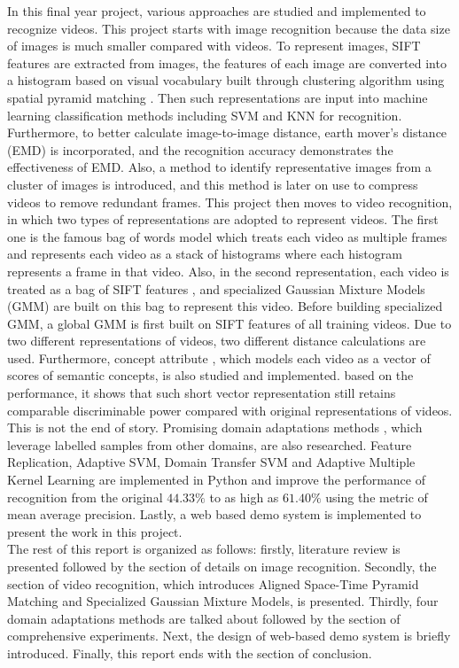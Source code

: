 \noindent In this final year project, various approaches are studied and implemented to recognize videos. This project starts with image recognition because the data size of images is much smaller compared with videos. To represent images, SIFT features \cite{lowe2004distinctive} are extracted from images, the features of each image are converted into a histogram based on visual vocabulary built through clustering algorithm using spatial pyramid matching \cite{lazebnik2006beyond}. Then such representations are input into machine learning classification methods including SVM and KNN for recognition. Furthermore, to better calculate image-to-image distance, earth mover's distance (EMD) \cite{rubner2000earth} is incorporated, and the recognition accuracy demonstrates the effectiveness of EMD. Also, a method to identify representative images from a cluster of images is introduced, and this method is later on use to compress videos to remove redundant frames. This project then moves to video recognition, in which two types of representations are adopted to represent videos. The first one is the famous bag of words model which treats each video as multiple frames and represents each video as a stack of histograms \cite{duan2012visual} where each histogram represents a frame in that video. Also, in the second representation, each video is treated as a bag of SIFT features \cite{zhou2008sift}, and specialized Gaussian Mixture Models (GMM) are built on this bag to represent this video. Before building specialized GMM, a global GMM is first built on SIFT features of all training videos. Due to two different representations of videos, two different distance calculations are used. Furthermore, concept attribute \cite{liu2013video}, which models each video as a vector of scores of semantic concepts, is also studied and implemented. based on the performance, it shows that such short vector representation still retains comparable discriminable power compared with original representations of videos. This is not the end of story. Promising domain adaptations methods \cite{duan2012visual, duan2009domain, yang2007cross, daume2007frustratingly}, which leverage labelled samples from other domains, are also researched. Feature Replication, Adaptive SVM, Domain Transfer SVM and Adaptive Multiple Kernel Learning are implemented in Python and improve the performance of recognition from the original $44.33\%$ to as high as $61.40\%$ using the metric of mean average precision. Lastly, a web based demo system is implemented to present the work in this project. \\

\noindent The rest of this report is organized as follows: firstly, literature review is presented followed by the section of details on image recognition. Secondly, the section of video recognition, which introduces Aligned Space-Time Pyramid Matching and Specialized Gaussian Mixture Models, is presented. Thirdly, four domain adaptations methods are talked about followed by the section of comprehensive experiments. Next, the design of web-based demo system is briefly introduced. Finally, this report ends with the section of conclusion. 